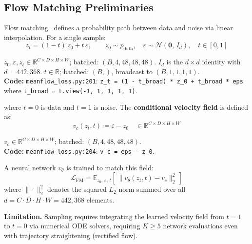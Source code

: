 \documentclass[11pt,a4paper]{article}
\newcommand{\code}[1]{\texttt{#1}}
\begin{document}
\subsection{Flow Matching Preliminaries}

Flow matching~\cite{lipman2023,liu2023} defines a probability path between data
and noise via linear interpolation.  For a single sample:
\begin{equation}
  z_t = (1-t)\,z_0 + t\,\varepsilon, \qquad
  z_0 \sim p_{\mathrm{data}},\quad
  \varepsilon \sim \mathcal{N}(\mathbf{0},\,I_d),\quad
  t \in [0,1]
  \label{eq:interpolation}
\end{equation}
\begin{shapes}
$z_0, \varepsilon, z_t \in \mathbb{R}^{C \times D \times H \times W}$;
\quad batched: $(B, 4, 48, 48, 48)$.
\quad $I_d$ is the $d \times d$ identity with $d = 442{,}368$.
\quad $t \in \mathbb{R}$; batched: $(B,)$, broadcast to $(B,1,1,1,1)$.\\
\textbf{Code:} \code{meanflow\_loss.py:201}:
\code{z\_t = (1 - t\_broad) * z\_0 + t\_broad * eps}
where \code{t\_broad = t.view(-1, 1, 1, 1, 1)}.
\end{shapes}

\noindent
where $t{=}0$ is data and $t{=}1$ is noise. The \textbf{conditional velocity field}
is defined as:
\begin{equation}
  v_c(z_t,t) \coloneqq \varepsilon - z_0
  \quad \in \mathbb{R}^{C \times D \times H \times W}
  \label{eq:cond_velocity}
\end{equation}
\begin{shapes}
$v_c \in \mathbb{R}^{C \times D \times H \times W}$;
\quad batched: $(B, 4, 48, 48, 48)$.\\
\textbf{Code:} \code{meanflow\_loss.py:204}: \code{v\_c = eps - z\_0}.
\end{shapes}

\noindent
A neural network $v_\theta$ is trained to match this field:
\begin{equation}
  \mathcal{L}_{\mathrm{FM}}
    = \mathbb{E}_{z_0,\,\varepsilon,\,t}
      \left[\,\bigl\|v_\theta(z_t,t) - v_c\bigr\|_2^2\,\right]
  \label{eq:fm_loss}
\end{equation}
where $\|\cdot\|_2^2$ denotes the squared $L_2$ norm summed over all
$d = C \cdot D \cdot H \cdot W = 442{,}368$ elements.

\textbf{Limitation.}  Sampling requires integrating the learned velocity field
from $t{=}1$ to $t{=}0$ via numerical ODE solvers, requiring $K \geq 5$
network evaluations even with trajectory straightening (rectified flow).
\end{document}
